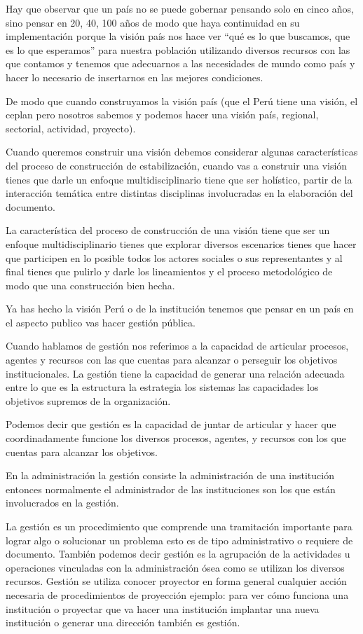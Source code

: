 \documentclass[
  a4paper,
]{article}
\begin{document}
Hay que observar que un país no se puede gobernar pensando solo en cinco
años, sino pensar en 20, 40, 100 años de modo que haya continuidad en su
implementación porque la visión país nos hace ver ``qué es lo que
buscamos, que es lo que esperamos'' para nuestra población utilizando
diversos recursos con las que contamos y tenemos que adecuarnos a las
necesidades de mundo como país y hacer lo necesario de insertarnos en
las mejores condiciones.

De modo que cuando construyamos la visión país (que el Perú tiene una
visión, el ceplan pero nosotros sabemos y podemos hacer una visión país,
regional, sectorial, actividad, proyecto).

Cuando queremos construir una visión debemos considerar algunas
características del proceso de construcción de estabilización, cuando
vas a construir una visión tienes que darle un enfoque
multidisciplinario tiene que ser holístico, partir de la interacción
temática entre distintas disciplinas involucradas en la elaboración del
documento.

La característica del proceso de construcción de una visión tiene que
ser un enfoque multidisciplinario tienes que explorar diversos
escenarios tienes que hacer que participen en lo posible todos los
actores sociales o sus representantes y al final tienes que pulirlo y
darle los lineamientos y el proceso metodológico de modo que una
construcción bien hecha.

Ya has hecho la visión Perú o de la institución tenemos que pensar en un
país en el aspecto publico vas hacer gestión pública.

Cuando hablamos de gestión nos referimos a la capacidad de articular
procesos, agentes y recursos con las que cuentas para alcanzar o
perseguir los objetivos institucionales. La gestión tiene la capacidad
de generar una relación adecuada entre lo que es la estructura la
estrategia los sistemas las capacidades los objetivos supremos de la
organización.

Podemos decir que gestión es la capacidad de juntar de articular y hacer
que coordinadamente funcione los diversos procesos, agentes, y recursos
con los que cuentas para alcanzar los objetivos.

En la administración la gestión consiste la administración de una
institución entonces normalmente el administrador de las instituciones
son los que están involucrados en la gestión.

La gestión es un procedimiento que comprende una tramitación importante
para lograr algo o solucionar un problema esto es de tipo administrativo
o requiere de documento. También podemos decir gestión es la agrupación
de la actividades u operaciones vinculadas con la administración ósea
como se utilizan los diversos recursos. Gestión se utiliza conocer
proyector en forma general cualquier acción necesaria de procedimientos
de proyección ejemplo: para ver cómo funciona una institución o
proyectar que va hacer una institución implantar una nueva institución o
generar una dirección también es gestión.
\end{document}
